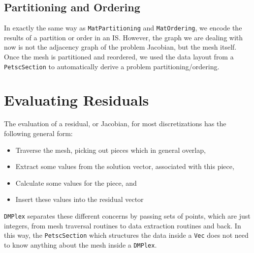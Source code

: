 \subsection{Partitioning and Ordering}

In exactly the same way as \lstinline{MatPartitioning} and \lstinline{MatOrdering}, we encode the results of a partition or order in an
IS. However, the graph we are dealing with now is not the adjacency graph of the problem Jacobian, but the mesh
itself. Once the mesh is partitioned and reordered, we used the data layout from a \lstinline{PetscSection} to automatically derive
a problem partitioning/ordering.

\section{Evaluating Residuals} 

The evaluation of a residual, or Jacobian, for most discretizations has the following general form:
\begin{itemize}
  \item Traverse the mesh, picking out pieces which in general overlap,

  \item Extract some values from the solution vector, associated with this piece,

  \item Calculate some values for the piece, and

  \item Insert these values into the residual vector
\end{itemize}
\lstinline{DMPlex} separates these different concerns by passing sets of points, which are just integers, from mesh traversal
routines to data extraction routines and back. In this way, the \lstinline{PetscSection} which structures the data inside a \lstinline{Vec} does
not need to know anything about the mesh inside a \lstinline{DMPlex}.

